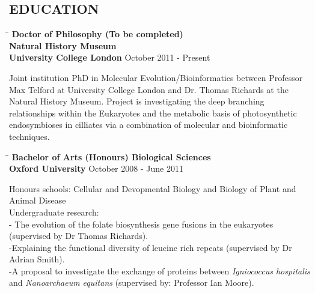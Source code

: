 \documentclass{res}
\begin{document}
\begin{resume}
        
\section{EDUCATION}          

\vspace{-0.05in}
\begin{tabbing}
   \hspace{2in}\= \hspace{2.6in}\= \kill 
    {\bf Doctor of Philosophy (To be completed)}\\ 
    {\bf Natural History Museum}\\
    {\bf University College London
    } \>      \>October 2011 - Present\\

   \end{tabbing}\vspace{-20pt}  
   
Joint institution PhD in Molecular Evolution/Bioinformatics between Professor Max Telford at University College London and Dr. Thomas Richards at the Natural History Museum.  Project is investigating the deep branching relationships within the Eukaryotes and the metabolic basis of photosynthetic endosymbioses in cilliates via a combination of molecular and bioinformatic techniques. %
 
 
\vspace{-0.1in}
 \begin{tabbing}
   \hspace{2in}\= \hspace{2.6in}\= \kill 
    {\bf Bachelor of Arts (Honours) Biological Sciences}\\
    {\bf Oxford University
    } \>      \>October 2008 - June 2011\\
                          

   \end{tabbing}\vspace{-20pt}  
Honours schools: Cellular and Devopmental Biology and Biology of Plant and Animal Disease\\
Undergraduate research: \\
- The evolution of the folate biosynthesis gene fusions in the eukaryotes (supervised by Dr Thomas Richards).
\\-Explaining the functional diversity of leucine rich repeats (supervised by Dr Adrian Smith).
\\-A proposal to investigate the exchange of proteins between  \emph{Igniococcus hospitalis} and  \emph{Nanoarchaeum equitans} (supervised by: Professor Ian Moore).



\end{resume}
\end{document}
